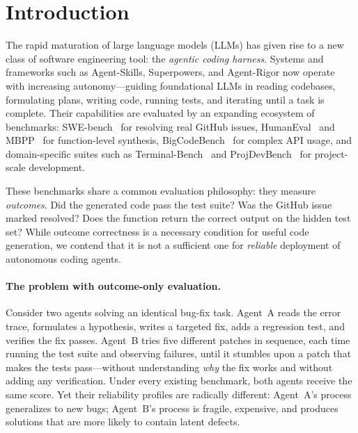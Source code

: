 \documentclass[letterpaper, 10 pt, conference]{ieeeconf}
\begin{document}
\section{Introduction}
\label{sec:introduction}

The rapid maturation of large language models (LLMs) has given rise to a new class of software engineering tool: the \emph{agentic coding harness}.
Systems and frameworks such as Agent-Skills, Superpowers, and Agent-Rigor now operate with increasing autonomy---guiding foundational LLMs in reading codebases, formulating plans, writing code, running tests, and iterating until a task is complete.
Their capabilities are evaluated by an expanding ecosystem of benchmarks: SWE-bench~\cite{jimenez2024swebench} for resolving real GitHub issues, HumanEval~\cite{chen2021evaluating} and MBPP~\cite{austin2021program} for function-level synthesis, BigCodeBench~\cite{zhuo2024bigcodebench} for complex API usage, and domain-specific suites such as Terminal-Bench~\cite{xie2024terminalbench} and ProjDevBench~\cite{zhang2024projdevbench} for project-scale development.

These benchmarks share a common evaluation philosophy: they measure \emph{outcomes}.
Did the generated code pass the test suite?
Was the GitHub issue marked resolved?
Does the function return the correct output on the hidden test set?
While outcome correctness is a necessary condition for useful code generation, we contend that it is not a sufficient one for \emph{reliable} deployment of autonomous coding agents.

\paragraph{The problem with outcome-only evaluation.}
Consider two agents solving an identical bug-fix task.
Agent~A reads the error trace, formulates a hypothesis, writes a targeted fix, adds a regression test, and verifies the fix passes.
Agent~B tries five different patches in sequence, each time running the test suite and observing failures, until it stumbles upon a patch that makes the tests pass---without understanding \emph{why} the fix works and without adding any verification.
Under every existing benchmark, both agents receive the same score.
Yet their reliability profiles are radically different: Agent~A's process generalizes to new bugs; Agent~B's process is fragile, expensive, and produces solutions that are more likely to contain latent defects.
\end{document}
